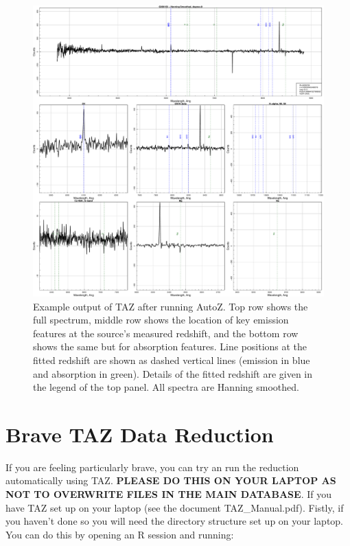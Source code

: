 \documentclass[12pt]{article}
\begin{document}
\begin{figure}
\begin{center}
\includegraphics[scale=0.4]{G006158.pdf}
\caption{Example output of TAZ after running AutoZ. Top row shows the full spectrum, middle row shows the location of key emission features at the source's measured redshift, and the bottom row shows the same but for absorption features. Line positions at the fitted redshift are shown as dashed vertical lines (emission in blue and absorption in green). Details of the fitted redshift are given in the legend of the top panel. All spectra are Hanning smoothed.}
\label{fig:specEx}
\end{center}
\end{figure}


\section{Brave TAZ Data Reduction}

If you are feeling particularly brave, you can try an run the reduction automatically using TAZ. \textbf{\textcolor{PineGreen}{PLEASE DO THIS ON YOUR LAPTOP AS NOT TO OVERWRITE FILES IN THE MAIN DATABASE}}. If you have TAZ set up on your laptop (see the document TAZ\_Manual.pdf). Fistly, if you haven't done so you will need the directory structure set up on your laptop. You can do this by opening an R session and running:\\
\end{document}
